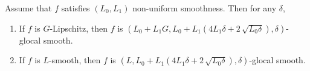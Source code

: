 \documentclass[10pt]{article} %
\begin{document}
\begin{proposition}
    Assume that $f$ satisfies $(L_{0}, L_{1})$ non-uniform smoothness. Then for any $\delta$,
    \begin{enumerate}
        \item If $f$ is $G$-Lipschitz, then $f$ is $(L_{0} + L_{1}G, L_{0} + L_{1}(4L_{1}\delta + 2 \, \sqrt{L_{0}\delta}), \delta)$-glocal smooth.
        \item If $f$ is $L$-smooth, then $f$ is $(L, L_{0} + L_{1}(4L_{1}\delta + 2 \, \sqrt{L_{0}\delta}), \delta)$-glocal smooth.
    \end{enumerate} 
\end{proposition}
\end{document}

